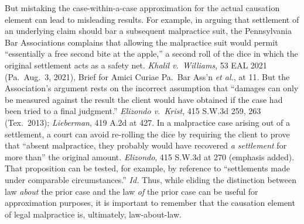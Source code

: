\documentclass[
  12pt,
  letterpaper,
]{scrartcl}
\begin{document}
But mistaking the case-within-a-case approximation for the actual causation
element can lead to misleading results. For example, in arguing that settlement
of an underlying claim should bar a subsequent malpractice suit, the
Pennsylvania Bar Associations complains that allowing the malpractice suit
would permit ``essentially a free second bite at the apple,'' a second roll of
the dice in which the original settlement acts as a safety net. \textit{Khalil
v.~Williams}, 53 EAL 2021 (Pa.~Aug.~3, 2021), Brief for Amici Curiae Pa.~Bar
Ass'n \textit{et al.}, at 11. But the Association's argument rests on the
incorrect assumption that ``damages can only be measured against the result the
client would have obtained if the case had been tried to a final judgment.''
\textit{Elizondo v.~Krist}, 415 S.W.3d 259, 263 (Tex.~2013);
\textit{Lieberman}, 419 A.2d at 427. In a malpractice case arising out of a
settlement, a court can avoid re-rolling the dice by requiring the client to
prove that ``absent malpractice, they probably would have recovered \emph{a
settlement} for more than'' the original amount. \textit{Elizondo}, 415 S.W.3d
at 270 (emphasis added). That proposition can be tested, for example, by
reference to ``settlements made under comparable circumstances.'' \textit{Id.}
Thus, while eliding the distinction between law \textit{about} the prior case
and the law \textit{of} the prior case can be useful for approximation
purposes, it is important to remember that the causation element of legal
malpractice is, ultimately, law-about-law.
\end{document}
